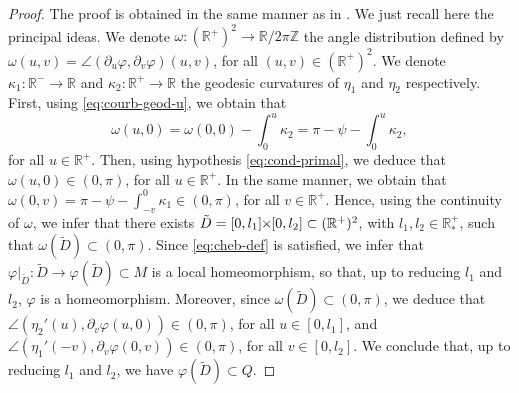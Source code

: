 \documentclass{article}
\newcommand{\PLH}{{\mkern-1mu\times\mkern-1mu}}
\newcommand{\Times}{\PLH}
\newcommand{\R}{\mathbb{R}}
\newcommand{\Z}{\mathbb{Z}}
\newcommand{\surf}{M}
\newcommand{\ko}{\kappa}
\newcommand{\DU}{\partial_{u}}
\newcommand{\DV}{\partial_{v}}
\newcommand{\sect}{Q}
\theoremstyle{remark}
\theoremstyle{prpart}
\begin{document}
\begin{proof}
 The proof is obtained in the same manner as in \cite{Sam95}. We just recall here the principal ideas. We denote $\omega:(\R^+)^2\to\R/2\pi\Z$ the angle distribution defined by $\omega(u,v) = \angle(\DU\varphi,\DV\varphi)(u,v)$, for all $(u,v)\in (\R^+)^2$. We denote $\ko_1:\R^-\to\R$ and $\ko_2:\R^+\to\R$ the geodesic curvatures of $\eta_1$ and $\eta_2$ respectively. First, using \eqref{eq:courb-geod-u}, we obtain that 
\begin{equation*}
  \omega(u,0) = \omega(0,0) - \int_0^u\ko_2 = \pi-\psi-\int_0^u\ko_2,
\end{equation*}
for all $u\in\R^+$. Then, using hypothesis \eqref{eq:cond-primal}, we deduce that $\omega(u,0)\in(0,\pi)$, for all $u\in\R^+$. In the same manner, we obtain that $\omega(0,v) = \pi-\psi-\int_{-v}^0\ko_1\in(0,\pi)$, for all $v\in\R^+$. Hence, using the continuity of $\omega$, we infer that there exists $\tilde D=[0,l_1]\Times[0,l_2]\subset(\R^+)^2$, with $l_1,l_2\in\R^+_\ast$, such that $\omega(\tilde D)\subset(0,\pi)$. Since \eqref{eq:cheb-def} is satisfied, we infer that $\varphi\big|_{\tilde D}:\tilde D\to\varphi(\tilde D)\subset\surf$ is a local homeomorphism, so that, up to reducing $l_1$ and $l_2$, $\varphi$ is a homeomorphism. Moreover, since $\omega(\tilde D)\subset(0,\pi)$, we deduce that $\angle(\eta_2'(u),\DV\varphi(u,0))\in(0,\pi)$, for all $u\in[0,l_1]$, and $\angle(\eta_1'(-v),\DV\varphi(0,v))\in(0,\pi)$, for all $v\in[0,l_2]$. We conclude that, up to reducing $l_1$ and $l_2$, we have $\varphi(\tilde D)\subset \sect$.


\end{proof}
\end{document}
